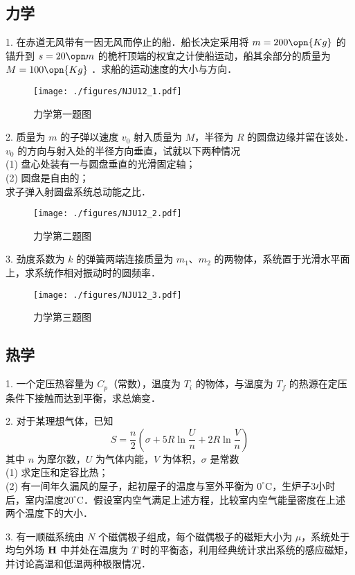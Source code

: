 \subsection{力学}
1. 在赤道无风带有一因无风而停止的船．船长决定采用将 $m=200\opn{Kg}$ 的锚升到 $s=20\opn m$ 的桅杆顶端的权宜之计使船运动，船其余部分的质量为 $M=100 \opn{Kg}$ ．求船的运动速度的大小与方向．
\begin{figure}[ht]
\centering
\texttt{[image: ./figures/NJU12\_1.pdf]}
\caption{力学第一题图} \label{NJU12_fig1}
\end{figure}
2. 质量为 $m$ 的子弹以速度 $v_0$ 射入质量为 $M$，半径为 $R$ 的圆盘边缘并留在该处．$v_0$ 的方向与射入处的半径方向垂直，试就以下两种情况\\
(1) 盘心处装有一与圆盘垂直的光滑固定轴；\\
(2) 圆盘是自由的；\\
求子弹入射圆盘系统总动能之比．
\begin{figure}[ht]
\centering
\texttt{[image: ./figures/NJU12\_2.pdf]}
\caption{力学第二题图} \label{NJU12_fig2}
\end{figure}
3. 劲度系数为 $k$ 的弹簧两端连接质量为 $m_1$、$m_2$ 的两物体，系统置于光滑水平面上，求系统作相对振动时的圆频率．
\begin{figure}[ht]
\centering
\texttt{[image: ./figures/NJU12\_3.pdf]}
\caption{力学第三题图} \label{NJU12_fig3}
\end{figure}
\subsection{热学}
1. 一个定压热容量为 $C_p$（常数），温度为 $T_i$ 的物体，与温度为 $T_f$ 的热源在定压条件下接触而达到平衡，求总熵变．

2. 对于某理想气体，已知
\begin{equation}
S=\frac n2 (\sigma+5R\ln{\frac Un}+2R\ln{\frac Vn})
\end{equation}
其中 $n$ 为摩尔数，$U$ 为气体内能，$V$ 为体积，$\sigma$ 是常数\\
(1) 求定压和定容比热；\\
(2) 有一间年久漏风的屋子，起初屋子的温度与室外平衡为 $0^\circ\mathrm{C}$，生炉子3小时后，室内温度$20^\circ\mathrm{C}$．假设室内空气满足上述方程，比较室内空气能量密度在上述两个温度下的大小．

3. 有一顺磁系统由 $N$ 个磁偶极子组成，每个磁偶极子的磁矩大小为 $\mu$，系统处于均匀外场 $\bf H$ 中并处在温度为 $T$ 时的平衡态，利用经典统计求出系统的感应磁矩，并讨论高温和低温两种极限情况．
